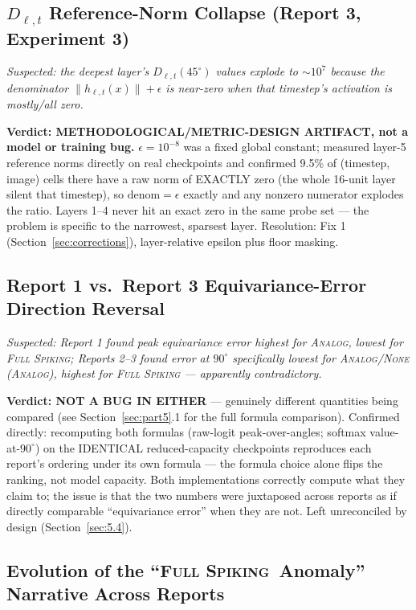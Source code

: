 \documentclass[11pt]{article}
\newcommand{\Analog}{\textsc{Analog}}
\newcommand{\None}{\textsc{None (Analog)}}
\newcommand{\FullSpiking}{\textsc{Full Spiking}}
\begin{document}
\subsection{$D_{\ell,t}$ Reference-Norm Collapse (Report 3, Experiment 3)}

\textit{Suspected: the deepest layer's $D_{\ell,t}(45^\circ)$ values explode to $\sim 10^7$ because the
denominator $\|h_{\ell,t}(x)\| + \epsilon$ is near-zero when that timestep's activation is mostly/all
zero.}

\textbf{Verdict: METHODOLOGICAL/METRIC-DESIGN ARTIFACT, not a model or training bug.} $\epsilon{=}10^{-8}$
was a fixed global constant; measured layer-5 reference norms directly on real checkpoints and confirmed
9.5\% of (timestep, image) cells there have a raw norm of EXACTLY zero (the whole 16-unit layer silent
that timestep), so $\text{denom}{=}\epsilon$ exactly and any nonzero numerator explodes the ratio.
Layers 1--4 never hit an exact zero in the same probe set --- the problem is specific to the narrowest,
sparsest layer. Resolution: Fix 1 (Section~\ref{sec:corrections}), layer-relative epsilon plus floor
masking.

\subsection{Report 1 vs.\ Report 3 Equivariance-Error Direction Reversal}

\textit{Suspected: Report 1 found peak equivariance error highest for \Analog, lowest for \FullSpiking;
Reports 2--3 found error at $90^\circ$ specifically lowest for \Analog/\None, highest for \FullSpiking
--- apparently contradictory.}

\textbf{Verdict: NOT A BUG IN EITHER} --- genuinely different quantities being compared (see
Section~\ref{sec:part5}.1 for the full formula comparison). Confirmed directly: recomputing both
formulas (raw-logit peak-over-angles; softmax value-at-$90^\circ$) on the IDENTICAL reduced-capacity
checkpoints reproduces each report's ordering under its own formula --- the formula choice alone flips
the ranking, not model capacity. Both implementations correctly compute what they claim to; the issue is
that the two numbers were juxtaposed across reports as if directly comparable ``equivariance error''
when they are not. Left unreconciled by design (Section~\ref{sec:5.4}).

\subsection{Evolution of the ``\FullSpiking\ Anomaly'' Narrative Across Reports}
\end{document}
